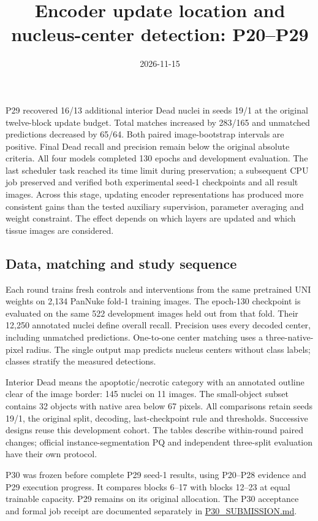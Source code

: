 \documentclass[
  11pt,
]{article}
\title{Encoder update location and nucleus-center detection: P20--P29}
\author{}
\date{2026-11-15}
\begin{document}
\maketitle

{
\setcounter{tocdepth}{2}
\tableofcontents
}
P29 recovered 16/13 additional interior Dead nuclei in seeds 19/1 at the
original twelve-block update budget. Total matches increased by 283/165
and unmatched predictions decreased by 65/64. Both paired
image-bootstrap intervals are positive. Final Dead recall and precision
remain below the original absolute criteria. All four models completed
130 epochs and development evaluation. The last scheduler task reached
its time limit during preservation; a subsequent CPU job preserved and
verified both experimental seed-1 checkpoints and all result images.
Across this stage, updating encoder representations has produced more
consistent gains than the tested auxiliary supervision, parameter
averaging and weight constraint. The effect depends on which layers are
updated and which tissue images are considered.

\subsection{Data, matching and study
sequence}\label{data-matching-and-study-sequence}

Each round trains fresh controls and interventions from the same
pretrained UNI weights on 2,134 PanNuke fold-1 training images. The
epoch-130 checkpoint is evaluated on the same 522 development images
held out from that fold. Their 12,250 annotated nuclei define overall
recall. Precision uses every decoded center, including unmatched
predictions. One-to-one center matching uses a three-native-pixel
radius. The single output map predicts nucleus centers without class
labels; classes stratify the measured detections.

Interior Dead means the apoptotic/necrotic category with an annotated
outline clear of the image border: 145 nuclei on 11 images. The
small-object subset contains 32 objects with native area below 67
pixels. All comparisons retain seeds 19/1, the original split, decoding,
last-checkpoint rule and thresholds. Successive designs reuse this
development cohort. The tables describe within-round paired changes;
official instance-segmentation PQ and independent three-split evaluation
have their own protocol.

P30 was frozen before complete P29 seed-1 results, using P20--P28
evidence and P29 execution progress. It compares blocks 6--17 with
blocks 12--23 at equal trainable capacity. P29 remains on its original
allocation. The P30 acceptance and formal job receipt are documented
separately in \href{../P30_SUBMISSION.md}{P30\_SUBMISSION.md}.
\end{document}
